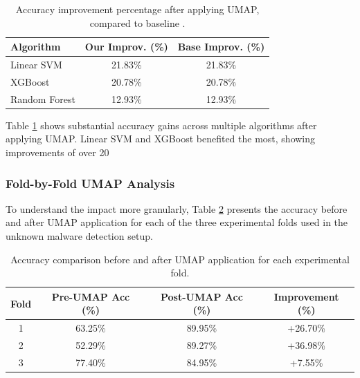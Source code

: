 \begin{table}[h!]
  \centering
  \captionsetup{labelformat=empty, textformat=simple}
  \caption{TABLE V: PERFORMANCE IMPROVEMENT AFTER UMAP}
  \label{tab:umap_improvement}
  \begin{tabular}{lcc}
    \toprule
    \textbf{Algorithm} & \textbf{Our Improv. (\%)} & \textbf{Base Improv. (\%)} \\
    \midrule
    Linear SVM      & 21.83\% & 21.83\% \\
    XGBoost         & 20.78\% & 20.78\% \\
    Random Forest   & 12.93\% & 12.93\% \\
    \bottomrule
  \end{tabular}
  \vspace{0.2cm} %
  \caption*{Accuracy improvement percentage after applying UMAP, compared to baseline \citep{bozkir2021catch}.} %
\end{table}

Table \ref{tab:umap_improvement} shows substantial accuracy gains across multiple algorithms after applying UMAP. Linear SVM and XGBoost benefited the most, showing improvements of over 20%

\subsubsection{Fold-by-Fold UMAP Analysis}
\label{subsubsec:fold_analysis}

To understand the impact more granularly, Table \ref{tab:fold_umap_analysis} presents the accuracy before and after UMAP application for each of the three experimental folds used in the unknown malware detection setup.

\begin{table}[h!]
  \centering
  \captionsetup{labelformat=empty, textformat=simple}
  \caption{TABLE VI: FOLD-BY-FOLD UMAP ANALYSIS}
  \label{tab:fold_umap_analysis}
  \begin{tabular}{cccc}
    \toprule
    \textbf{Fold} & \textbf{Pre-UMAP Acc (\%)} & \textbf{Post-UMAP Acc (\%)} & \textbf{Improvement (\%)} \\
    \midrule
    1             & 63.25\% & 89.95\% & +26.70\% \\
    2             & 52.29\% & 89.27\% & +36.98\% \\
    3             & 77.40\% & 84.95\% & +7.55\% \\
    \bottomrule
  \end{tabular}
  \vspace{0.2cm} %
  \caption*{Accuracy comparison before and after UMAP application for each experimental fold.} %
\end{table}

